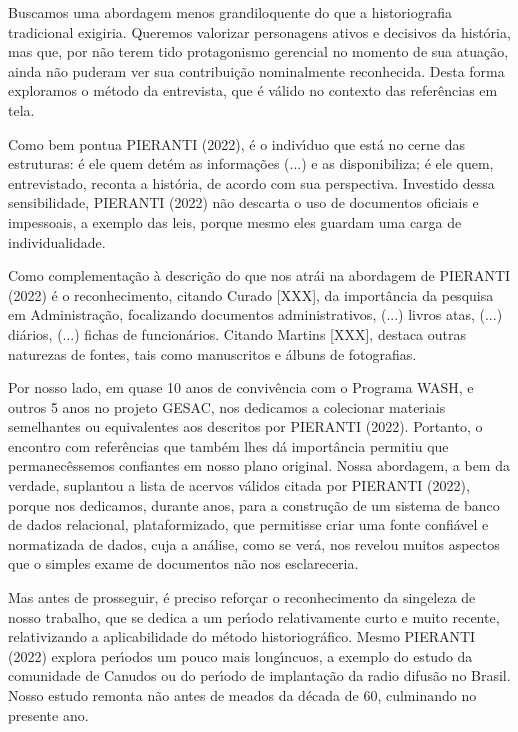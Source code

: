 \documentclass[
12pt,		%
openright,	%
twoside,  %
a4paper,			%
chapter=TITLE,		%
english,			%
french,				%
spanish,			%
brazil				%
]{USPSC-classe/USPSC}
\begin{document}
Buscamos uma abordagem menos grandiloquente do que a historiografia tradicional exigiria. Queremos valorizar personagens ativos e decisivos da hist\'oria, mas que, por n\~ao terem tido protagonismo gerencial no momento de sua atua\c{c}\~ao, ainda n\~ao puderam ver sua contribui\c{c}\~ao nominalmente reconhecida. Desta forma exploramos o m\'etodo da entrevista, que \'e v\'alido no contexto das refer\^encias em tela.




Como bem pontua  PIERANTI (2022), \textquotedbl \'e o indiv\'{\i}duo que est\'a no cerne das estruturas: \'e ele quem det\'em as informa\c{c}\~oes (...) e as disponibiliza; \'e ele quem, entrevistado, reconta a hist\'oria, de acordo com sua perspectiva\textquotedbl . Investido dessa sensibilidade,  PIERANTI (2022) n\~ao descarta o uso de documentos oficiais e impessoais, a exemplo das leis, porque mesmo eles \textquotedbl guardam uma carga de individualidade\textquotedbl .




Como complementa\c{c}\~ao \`a descri\c{c}\~ao do que nos atr\'ai na abordagem de  PIERANTI (2022) \'e o reconhecimento, citando Curado [XXX], da import\^ancia da pesquisa em Administra\c{c}\~ao, focalizando \textquotedbl documentos administrativos, (...) livros atas, (...) di\'arios, (...) fichas de funcion\'arios\textquotedbl . Citando Martins [XXX], destaca outras naturezas de fontes, tais como manuscritos e \'albuns de fotografias.




Por nosso lado, em quase 10 anos de conviv\^encia com o Programa WASH, e outros 5 anos no projeto GESAC, nos dedicamos a colecionar materiais semelhantes ou equivalentes aos descritos por PIERANTI (2022). Portanto, o encontro com refer\^encias que tamb\'em lhes d\'a import\^ancia permitiu que permanec\^essemos confiantes em nosso plano original. Nossa abordagem, a bem da verdade, suplantou a lista de acervos v\'alidos citada por  PIERANTI (2022), porque nos dedicamos, durante anos, para a constru\c{c}\~ao de um sistema de banco de dados relacional, plataformizado, que permitisse criar uma fonte confi\'avel e normatizada de dados, cuja a an\'alise, como se ver\'a, nos revelou muitos aspectos que o simples exame de documentos n\~ao nos esclareceria.




Mas antes de prosseguir, \'e preciso refor\c{c}ar o reconhecimento da singeleza de nosso trabalho, que se dedica a um per\'{\i}odo relativamente curto e muito recente, relativizando a aplicabilidade do m\'etodo historiogr\'afico. Mesmo  PIERANTI (2022) explora per\'{\i}odos um pouco mais long\'{\i}ncuos, a exemplo do estudo da comunidade de Canudos ou do per\'{\i}odo de implanta\c{c}\~ao da radio difus\~ao no Brasil. Nosso estudo remonta n\~ao antes de meados da d\'ecada de 60, culminando no presente ano.
\end{document}
